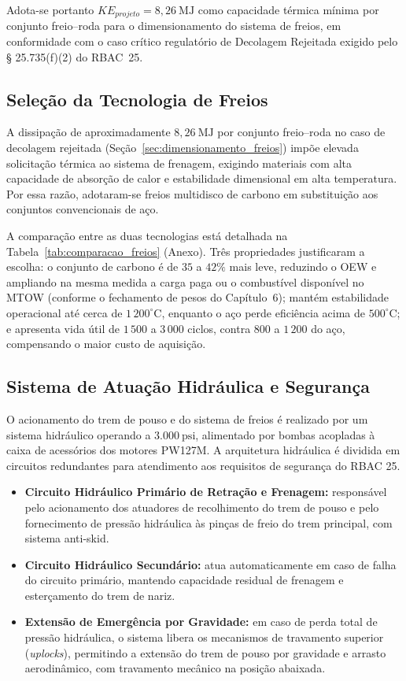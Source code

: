 Adota-se portanto $KE_{projeto} = 8{,}26\ \text{MJ}$ como capacidade térmica mínima
por conjunto freio--roda para o dimensionamento do sistema de freios, em conformidade
com o caso crítico regulatório de Decolagem Rejeitada exigido pelo § 25.735(f)(2)
do RBAC~25.

\subsection{Seleção da Tecnologia de Freios}

A dissipação de aproximadamente $8{,}26~\text{MJ}$ por conjunto freio--roda no caso de decolagem rejeitada (Seção~\ref{sec:dimensionamento_freios}) impõe elevada solicitação térmica ao sistema de frenagem, exigindo materiais com alta capacidade de absorção de calor e estabilidade dimensional em alta temperatura. Por essa razão, adotaram-se freios multidisco de carbono em substituição aos conjuntos convencionais de aço.

A comparação entre as duas tecnologias está detalhada na Tabela~\ref{tab:comparacao_freios} (Anexo). Três propriedades justificaram a escolha: o conjunto de carbono é de $35$ a $42\%$ mais leve, reduzindo o OEW e ampliando na mesma medida a carga paga ou o combustível disponível no MTOW (conforme o fechamento de pesos do Capítulo~6); mantém estabilidade operacional até cerca de $1\,200^\circ\text{C}$, enquanto o aço perde eficiência acima de $500^\circ\text{C}$; e apresenta vida útil de $1\,500$ a $3\,000$ ciclos, contra $800$ a $1\,200$ do aço, compensando o maior custo de aquisição.


\subsection{Sistema de Atuação Hidráulica e Segurança}

O acionamento do trem de pouso e do sistema de freios é realizado por um sistema hidráulico operando a $3.000 \ \text{psi}$, alimentado por bombas acopladas à caixa de acessórios dos motores PW127M. A arquitetura hidráulica é dividida em circuitos redundantes para atendimento aos requisitos de segurança do RBAC 25.

\begin{itemize}
    \item \textbf{Circuito Hidráulico Primário de Retração e Frenagem:} responsável pelo acionamento dos atuadores de recolhimento do trem de pouso e pelo fornecimento de pressão hidráulica às pinças de freio do trem principal, com sistema anti-skid.

    \item \textbf{Circuito Hidráulico Secundário:} atua automaticamente em caso de falha do circuito primário, mantendo capacidade residual de frenagem e esterçamento do trem de nariz.

    \item \textbf{Extensão de Emergência por Gravidade:} em caso de perda total de pressão hidráulica, o sistema libera os mecanismos de travamento superior (\textit{uplocks}), permitindo a extensão do trem de pouso por gravidade e arrasto aerodinâmico, com travamento mecânico na posição abaixada.
\end{itemize}

